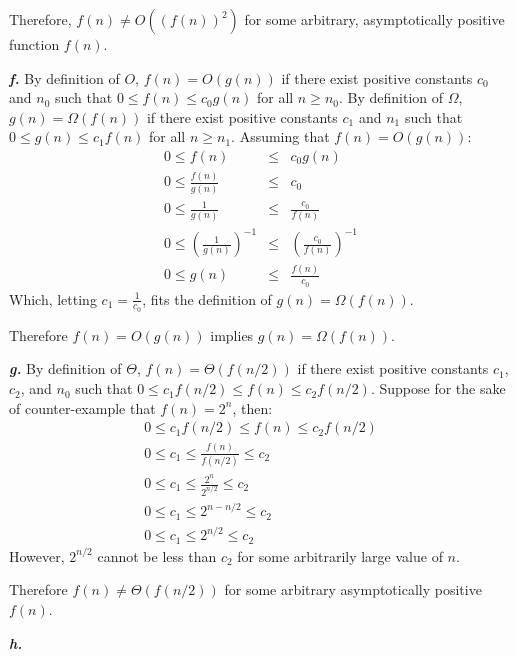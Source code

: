 \documentclass{article}
\begin{document}
Therefore, $f(n) \neq O((f(n))^2)$ for some arbitrary, asymptotically positive function $f(n)$.

\noindent\textbf{\textit{f.}} By definition of $O$, $f(n) = O(g(n))$ if there exist positive constants $c_0$ and $n_0$ such that $0 \leq f(n) \leq c_0 g(n)$ for all $n \geq n_0$. By definition of $\Omega$, $g(n) = \Omega(f(n))$ if there exist positive constants $c_1$ and $n_1$ such that $0 \leq g(n) \leq c_1 f(n)$ for all $n \geq n_1$. Assuming that $f(n) = O(g(n))$:
\begin{eqnarray*}
	0 \leq f(n) & \leq & c_0 g(n) \\
	0 \leq \frac{f(n)}{g(n)} & \leq & c_0 \\
	0 \leq \frac{1}{g(n)} & \leq & \frac{c_0}{f(n)} \\
	0 \leq \left ( \frac{1}{g(n)} \right )^{-1} & \leq & \left ( \frac{c_0}{f(n)} \right )^{-1} \\
	0 \leq g(n) & \leq & \frac{f(n)}{c_0}
\end{eqnarray*}
Which, letting $c_1 = \frac{1}{c_0}$, fits the definition of $g(n) = \Omega(f(n))$.

Therefore $f(n) = O(g(n))$ implies $g(n) = \Omega(f(n))$.

\noindent\textbf{\textit{g.}} By definition of $\Theta$, $f(n) = \Theta(f(n/2))$ if there exist positive constants $c_1$, $c_2$, and $n_0$ such that $0 \leq c_1 f(n/2) \leq f(n) \leq c_2 f(n/2)$. Suppose for the sake of counter-example that $f(n) = 2^n$, then:
\begin{eqnarray*}
	0 \leq c_1 f(n/2) \leq f(n) \leq c_2 f(n/2) \\
	0 \leq c_1 \leq \frac{f(n)}{f(n/2)} \leq c_2 \\
	0 \leq c_1 \leq \frac{2^n}{2^{n/2}} \leq c_2 \\
	0 \leq c_1 \leq 2^{n - n/2} \leq c_2 \\
	0 \leq c_1 \leq 2^{n/2} \leq c_2
\end{eqnarray*}
However, $2^{n/2}$ cannot be less than $c_2$ for some arbitrarily large value of $n$.

Therefore $f(n) \neq \Theta(f(n/2))$ for some arbitrary asymptotically positive $f(n)$.

\noindent\textbf{\textit{h.}}
\end{document}
